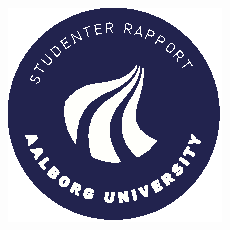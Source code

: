 \begin{titlepage}
\begin{center}
    \includegraphics[width=0.2\paperwidth]{AAUgraphics/aau_logo_circle_da}  %
  \end{center}
\end{titlepage}
\clearpage
